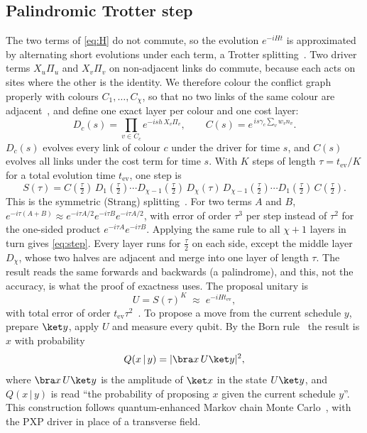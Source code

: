 \documentclass[11pt,a4paper]{article}
\begin{document}
\subsection{Palindromic Trotter step}
The two terms of \eqref{eq:H} do not commute, so the evolution $e^{-iHt}$ is approximated by
alternating short evolutions under each term, a Trotter splitting~\cite{trotter1959product,lloyd1996universal}.
Two driver terms $X_u\Pi_u$ and $X_v\Pi_v$ on non-adjacent links do commute, because each acts on sites
where the other is the identity. We therefore colour the conflict graph properly with colours
$C_1,\dots,C_\chi$, so that no two links of the same colour are adjacent~\cite{welsh1967upper}, and
define one exact layer per colour and one cost layer:
\begin{equation}\label{eq:layers}
D_c(s)=\prod_{v\in C_c}e^{-ish\,X_v\Pi_v},\qquad C(s)=e^{\,is\gamma_c\sum_vw_vn_v} .
\end{equation}
$D_c(s)$ evolves every link of colour $c$ under the driver for time $s$, and $C(s)$ evolves all links
under the cost term for time $s$. With $K$ steps of length $\tau=t_{\mathrm{ev}}/K$ for a total
evolution time $t_{\mathrm{ev}}$, one step is
\begin{equation}\label{eq:step}
S(\tau)=C(\tfrac\tau2)\,D_1(\tfrac\tau2)\cdots D_{\chi-1}(\tfrac\tau2)\,D_\chi(\tau)\,
D_{\chi-1}(\tfrac\tau2)\cdots D_1(\tfrac\tau2)\,C(\tfrac\tau2).
\end{equation}
This is the symmetric (Strang) splitting~\cite{strang1968construction,suzuki1991general}. For two terms
$A$ and $B$, $e^{-i\tau(A+B)}\approx e^{-i\tau A/2}e^{-i\tau B}e^{-i\tau A/2}$, with error of order
$\tau^3$ per step instead of $\tau^2$ for the one-sided product $e^{-i\tau A}e^{-i\tau B}$. Applying the
same rule to all $\chi+1$ layers in turn gives \eqref{eq:step}. Every layer runs for $\frac\tau2$ on each
side, except the middle layer $D_\chi$, whose two halves are adjacent and merge into one layer of length
$\tau$. The result reads the same forwards and backwards (a palindrome), and this, not the accuracy, is
what the proof of exactness uses. The proposal unitary is
\begin{equation}\label{eq:U}
U=S(\tau)^K\;\approx\;e^{-iHt_{\mathrm{ev}}},
\end{equation}
with total error of order $t_{\mathrm{ev}}\tau^2$~\cite{suzuki1991general}. To propose a move from the
current schedule $y$, prepare $\ket y$, apply $U$ and measure every qubit. By the Born
rule~\cite{nielsen2010quantum} the result is $x$ with probability
\begin{equation}\label{eq:Q}
Q(x\,|\,y)=|\bra x\,U\ket y|^2 ,
\end{equation}
where $\bra x\,U\ket y$ is the amplitude of $\ket x$ in the state $U\ket y$, and $Q(x\,|\,y)$ is read
``the probability of proposing $x$ given the current schedule $y$''. This construction follows
quantum-enhanced Markov chain Monte Carlo~\cite{layden2023quantum}, with the PXP driver in place of a
transverse field.
\end{document}
